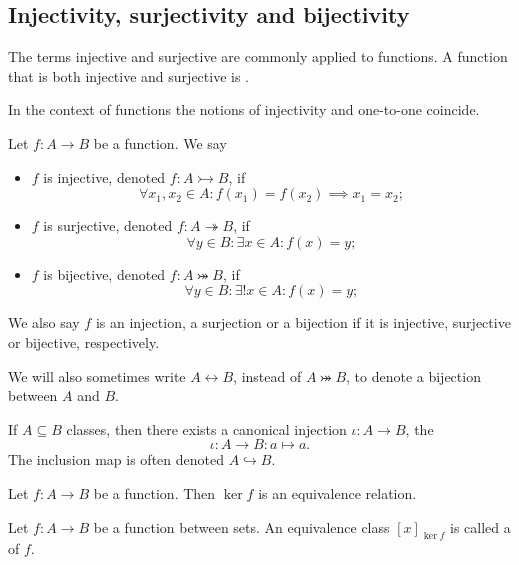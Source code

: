 \subsection{Injectivity, surjectivity and bijectivity}
\begin{definition}
The terms injective and surjective are commonly applied to functions. A function that is both injective and surjective is .
\end{definition}
In the context of functions the notions of injectivity and one-to-one coincide.
\begin{lemma}
Let $f:A\to B$ be a function. We say
\begin{itemize}
\item $f$ is injective, denoted $f: A\rightarrowtail B$, if
\[ \forall x_1,x_2\in A: f(x_1) = f(x_2) \implies x_1 = x_2; \]
\item $f$ is surjective, denoted $f: A\twoheadrightarrow B$, if
\[ \forall y\in B: \exists x\in A: f(x) = y; \]
\item $f$ is bijective, denoted $f: A\twoheadrightarrowtail B$, if
\[ \forall y\in B: \exists! x\in A: f(x) = y; \]
\end{itemize}
We also say $f$ is an injection, a surjection or a bijection if it is injective, surjective or bijective, respectively.

We will also sometimes write $A \leftrightarrow B$, instead of $A\twoheadrightarrowtail B$, to denote a bijection between $A$ and $B$.
\end{lemma}

\begin{lemma}
If $A\subseteq B$ classes, then there exists a canonical injection $\iota: A\to B$, the 
\[ \iota: A\to B: a\mapsto a. \]
The inclusion map is often denoted $A\hookrightarrow B$.
\end{lemma}

\begin{lemma}
Let $f:A\to B$ be a function. Then $\ker f$ is an equivalence relation.
\end{lemma}

\begin{definition}
Let $f: A\to B$ be a function between sets. An equivalence class $[x]_{\ker f}$ is called a  of $f$.
\end{definition}

